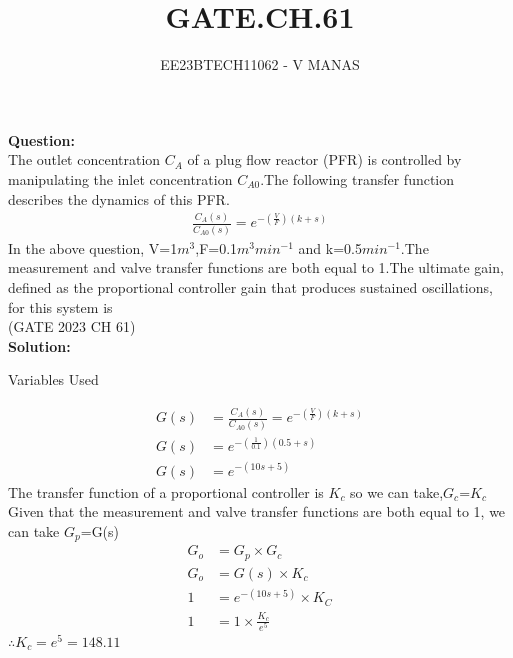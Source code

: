 \documentclass[journal,12pt,twocolumn]{IEEEtran}
\theoremstyle{remark}
\begin{document}

\vspace{3cm}

\title{GATE.CH.61}
\author{EE23BTECH11062 - V MANAS}
\maketitle
\newpage

\bigskip
\textbf{Question:}\\The outlet concentration $C_A$ of a plug flow reactor (PFR) is controlled by manipulating the inlet concentration $C_{A0}$.The following transfer function describes the dynamics of this PFR.
\begin{align*}
    \frac{C_{A}(s)}{C_{A0}(s)}=e^{-(\frac{V}{F})(k+s)}
\end{align*}
In the above question, V=1$m^3$,F=0.1$m^3$$min^{-1}$ and k=0.5$min^{-1}$.The measurement and valve transfer functions are both equal to 1.The ultimate gain, defined as the proportional controller gain that produces sustained oscillations, for this system is\\ \hfill{(GATE 2023 CH 61)}\\
\textbf{Solution:}\\
\begin{table}[h]
    \centering
    
    \caption{Variables Used}
    \label{tab:GATE2023.CH.61}
\end{table}
\begin{align}
    G(s)&=\frac{C_A(s)}{C_{A0}(s)}=e^{-(\frac{V}{F})(k+s)}\\
    G(s)&=e^{-(\frac{1}{0.1})(0.5+s)}\\
    G(s)&=e^{-(10s+5)}
\end{align}
The transfer function of a proportional controller is $K_c$ so we can take,$G_c$=$K_c$\\
Given that the measurement and valve transfer functions are both equal to 1, we can take $G_p$=G(s)
\begin{align}
    G_o&=G_p\times G_c\\
    G_o&=G(s)\times K_c\\
    1&=e^{-(10s+5)}\times K_C\\
    1&=1\times \frac{K_c}{e^5}
\end{align}
$\therefore K_c=e^5=148.11$
\end{document}
